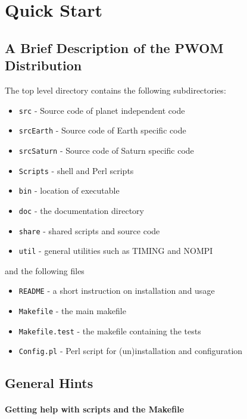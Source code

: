 
\chapter{Quick Start}

\section{A Brief Description of the PWOM Distribution}

The top level directory contains the following subdirectories:
\begin{itemize}
\item {\tt src}       - Source code of planet independent code
\item {\tt srcEarth}  - Source code of Earth specific code      
\item {\tt srcSaturn} - Source code of Saturn specific code 
\item {\tt Scripts}   - shell and Perl scripts
\item {\tt bin}       - location of executable
\item {\tt doc}       - the documentation directory 
\item {\tt share}     - shared scripts and source code
\item {\tt util}      - general utilities such as TIMING and NOMPI
\end{itemize}
and the following files
\begin{itemize}
\item {\tt README}        - a short instruction on installation and usage
\item {\tt Makefile}      - the main makefile
\item {\tt Makefile.test} - the makefile containing the tests 
\item {\tt Config.pl}     - Perl script for (un)installation and configuration
\end{itemize}

\section{General Hints}

\subsubsection{Getting help with scripts and the Makefile}

